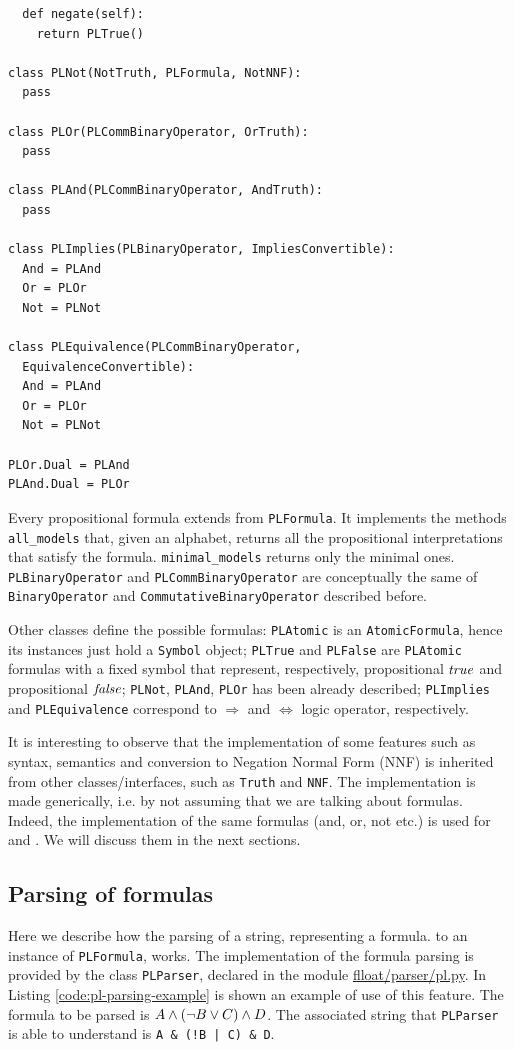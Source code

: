 \begin{lstlisting}
  def negate(self):
    return PLTrue()

class PLNot(NotTruth, PLFormula, NotNNF):
  pass

class PLOr(PLCommBinaryOperator, OrTruth):
  pass

class PLAnd(PLCommBinaryOperator, AndTruth):
  pass

class PLImplies(PLBinaryOperator, ImpliesConvertible):
  And = PLAnd
  Or = PLOr
  Not = PLNot

class PLEquivalence(PLCommBinaryOperator, 
  EquivalenceConvertible):
  And = PLAnd
  Or = PLOr
  Not = PLNot

PLOr.Dual = PLAnd
PLAnd.Dual = PLOr

\end{lstlisting}
Every propositional formula extends from \texttt{PLFormula}. It implements the methods \texttt{all\_models} that, given an alphabet, returns all the propositional interpretations that satisfy the formula. \texttt{minimal\_models} returns only the minimal ones. \texttt{PLBinaryOperator} and \texttt{PLCommBinaryOperator} are conceptually the same of \texttt{BinaryOperator} and \texttt{CommutativeBinaryOperator} described before. 

Other classes define the possible \PL formulas: \texttt{PLAtomic} is an \texttt{AtomicFormula}, hence its instances just hold a \texttt{Symbol} object; \texttt{PLTrue} and \texttt{PLFalse} are \texttt{PLAtomic} formulas with a fixed symbol that represent, respectively, propositional $\mathit{true}$ and propositional $\mathit{false}$; \texttt{PLNot}, \texttt{PLAnd}, \texttt{PLOr} has been already described; \texttt{PLImplies} and \texttt{PLEquivalence} correspond to $\Rightarrow$ and $\Leftrightarrow$ logic operator, respectively.

It is interesting to observe that the implementation of some features such as syntax, semantics and conversion to Negation Normal Form (NNF) is inherited from other classes/interfaces, such as \texttt{Truth} and \texttt{NNF}. The implementation is made generically, i.e. by not assuming that we are talking about \PL formulas. Indeed, the implementation of the same formulas (and, or, not etc.) is used for \PL and \LLf. We will discuss them in the next sections.

\subsection{Parsing of \PL formulas}\label{sect:flloat-pl-parsing}
Here we describe how the parsing of a string, representing a \PL formula. to an instance of \texttt{PLFormula}, works. The implementation of the \PL formula parsing is provided by the class \texttt{PLParser}, declared in the module \href{https://github.com/MarcoFavorito/flloat/blob/0.1.4/flloat/parser/pl.py}{flloat/parser/pl.py}.
In Listing \ref{code:pl-parsing-example} is shown an example of use of this feature. The formula to be parsed is $A \wedge (\lnot B \vee C) \wedge D$. The associated string that \texttt{PLParser} is able to understand is \texttt{A \& (!B | C) \& D}.

